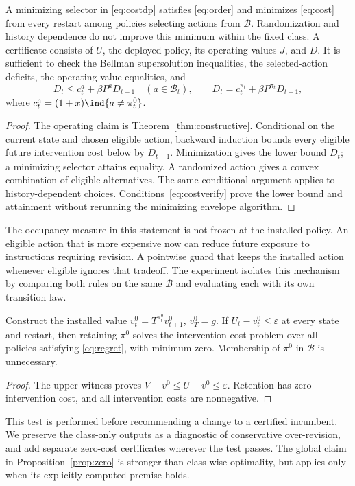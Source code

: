 \begin{theorem}\label{thm:cost}
A minimizing selector in \eqref{eq:costdp} satisfies \eqref{eq:order} and minimizes \eqref{eq:cost} from every restart among policies selecting actions from $\mathcal B$. Randomization and history dependence do not improve this minimum within the fixed class. A certificate consists of $U$, the deployed policy, its operating values $J$, and $D$. It is sufficient to check the Bellman supersolution inequalities, the selected-action deficits, the operating-value equalities, and
\begin{equation}\label{eq:costverify}
 D_t\le c_t^a+\beta P^aD_{t+1}\quad(a\in\mathcal B_t),\qquad
 D_t=c_t^{\pi_t}+\beta P^{\pi_t}D_{t+1},
\end{equation}
where $c_t^a=(1+x)\ind\{a\ne\pi_t^0\}$.
\end{theorem}
\begin{proof}
The operating claim is Theorem~\ref{thm:constructive}. Conditional on the current state and chosen eligible action, backward induction bounds every eligible future intervention cost below by $D_{t+1}$. Minimization gives the lower bound $D_t$; a minimizing selector attains equality. A randomized action gives a convex combination of eligible alternatives. The same conditional argument applies to history-dependent choices. Conditions~\eqref{eq:costverify} prove the lower bound and attainment without rerunning the minimizing envelope algorithm.\end{proof}

The occupancy measure in this statement is not frozen at the installed policy. An eligible action that is more expensive now can reduce future exposure to instructions requiring revision. A pointwise guard that keeps the installed action whenever eligible ignores that tradeoff. The experiment isolates this mechanism by comparing both rules on the same $\mathcal B$ and evaluating each with its own transition law.

\begin{proposition}\label{prop:zero}
Construct the installed value $v_t^0=T^{\pi_t^0}v_{t+1}^0$, $v_T^0=g$. If $U_t-v_t^0\le\varepsilon$ at every state and restart, then retaining $\pi^0$ solves the intervention-cost problem over all policies satisfying \eqref{eq:regret}, with minimum zero. Membership of $\pi^0$ in $\mathcal B$ is unnecessary.
\end{proposition}
\begin{proof}
The upper witness proves $V-v^0\le U-v^0\le\varepsilon$. Retention has zero intervention cost, and all intervention costs are nonnegative.\end{proof}
This test is performed before recommending a change to a certified incumbent. We preserve the class-only outputs as a diagnostic of conservative over-revision, and add separate zero-cost certificates wherever the test passes. The global claim in Proposition~\ref{prop:zero} is stronger than class-wise optimality, but applies only when its explicitly computed premise holds.

